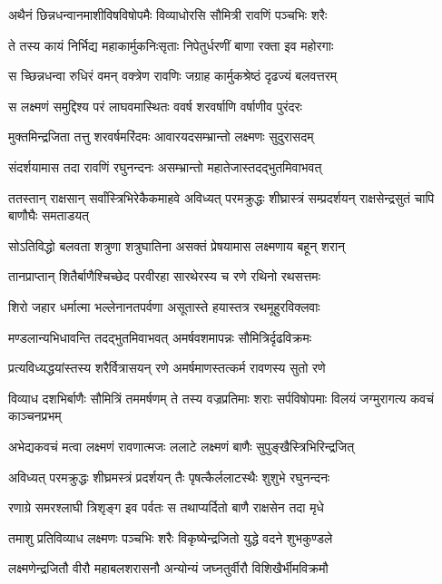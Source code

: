 \twolineshloka
{अथैनं छिन्नधन्वानमाशीविषविषोपमैः}
{विव्याधोरसि सौमित्री रावणिं पञ्चभिः शरैः} %

\twolineshloka
{ते तस्य कायं निर्भिद्य महाकार्मुकनिःसृताः}
{निपेतुर्धरणीं बाणा रक्ता इव महोरगाः} %

\twolineshloka
{स च्छिन्नधन्वा रुधिरं वमन् वक्त्रेण रावणिः}
{जग्राह कार्मुकश्रेष्ठं दृढज्यं बलवत्तरम्} %

\twolineshloka
{स लक्ष्मणं समुद्दिश्य परं लाघवमास्थितः}
{ववर्ष शरवर्षाणि वर्षाणीव पुरंदरः} %

\twolineshloka
{मुक्तमिन्द्रजिता तत्तु शरवर्षमरिंदमः}
{आवारयदसम्भ्रान्तो लक्ष्मणः सुदुरासदम्} %

\twolineshloka
{संदर्शयामास तदा रावणिं रघुनन्दनः}
{असम्भ्रान्तो महातेजास्तदद्भुतमिवाभवत्} %

\threelineshloka
{ततस्तान् राक्षसान् सर्वांस्त्रिभिरेकैकमाहवे}
{अविध्यत् परमक्रुद्धः शीघ्रास्त्रं सम्प्रदर्शयन्}
{राक्षसेन्द्रसुतं चापि बाणौघैः समताडयत्} %

\twolineshloka
{सोऽतिविद्धो बलवता शत्रुणा शत्रुघातिना}
{असक्तं प्रेषयामास लक्ष्मणाय बहून् शरान्} %

\twolineshloka
{तानप्राप्तान् शितैर्बाणैश्चिच्छेद परवीरहा}
{सारथेरस्य च रणे रथिनो रथसत्तमः} %

\twolineshloka
{शिरो जहार धर्मात्मा भल्लेनानतपर्वणा}
{असूतास्ते हयास्तत्र रथमूहुरविक्लवाः} %

\twolineshloka
{मण्डलान्यभिधावन्ति तदद्भुतमिवाभवत्}
{अमर्षवशमापन्नः सौमित्रिर्दृढविक्रमः} %

\twolineshloka
{प्रत्यविध्यद्धयांस्तस्य शरैर्वित्रासयन् रणे}
{अमर्षमाणस्तत्कर्म रावणस्य सुतो रणे} %

\threelineshloka
{विव्याध दशभिर्बाणैः सौमित्रिं तममर्षणम्}
{ते तस्य वज्रप्रतिमाः शराः सर्पविषोपमाः}
{विलयं जग्मुरागत्य कवचं काञ्चनप्रभम्} %

\twolineshloka
{अभेद्यकवचं मत्वा लक्ष्मणं रावणात्मजः}
{ललाटे लक्ष्मणं बाणैः सुपुङ्खैस्त्रिभिरिन्द्रजित्} %

\twolineshloka
{अविध्यत् परमक्रुद्धः शीघ्रमस्त्रं प्रदर्शयन्}
{तैः पृषत्कैर्ललाटस्थैः शुशुभे रघुनन्दनः} %

\twolineshloka
{रणाग्रे समरश्लाघी त्रिशृङ्ग इव पर्वतः}
{स तथाप्यर्दितो बाणै राक्षसेन तदा मृधे} %

\twolineshloka
{तमाशु प्रतिविव्याध लक्ष्मणः पञ्चभिः शरैः}
{विकृष्येन्द्रजितो युद्धे वदने शुभकुण्डले} %

\twolineshloka
{लक्ष्मणेन्द्रजितौ वीरौ महाबलशरासनौ}
{अन्योन्यं जघ्नतुर्वीरौ विशिखैर्भीमविक्रमौ} %

